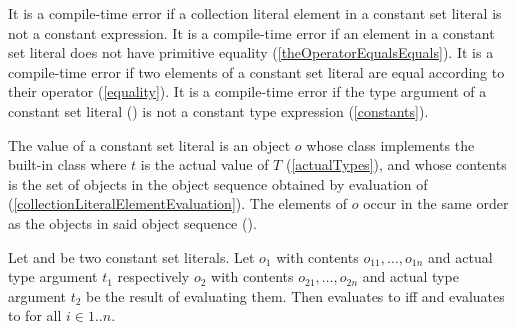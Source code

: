 \documentclass[makeidx]{article}
\begin{document}
{

\LMHash{}%
It is a compile-time error if
a collection literal element in a constant set literal
is not a constant expression.
It is a compile-time error if
an element in a constant set literal
does not have primitive equality
(\ref{theOperatorEqualsEquals}).
It is a compile-time error if two elements of a constant set literal are equal
according to their \lit{==} operator
(\ref{equality}).
It is a compile-time error if the type argument of a constant set literal
()
is not a constant type expression
(\ref{constants}).


\LMHash{}%
The value of a constant set literal
is an object $o$ whose class implements the built-in class
where $t$ is the actual value of $T$
(\ref{actualTypes}),
and whose contents is the set of objects in
the object sequence  obtained by
evaluation of 
(\ref{collectionLiteralElementEvaluation}).
The elements of $o$ occur in the same order as
the objects in said object sequence
().

\LMHash{}%
Let 
and 
be two constant set literals.
Let $o_1$ with contents $o_{11}, \ldots, o_{1n}$ and actual type argument $t_1$
respectively
$o_2$ with contents $o_{21}, \ldots, o_{2n}$ and actual type argument $t_2$
be the result of evaluating them.
Then  evaluates to \TRUE{} if{}f
 and 
evaluates to \TRUE{} for all $i \in 1 .. n$.


}
\end{document}
